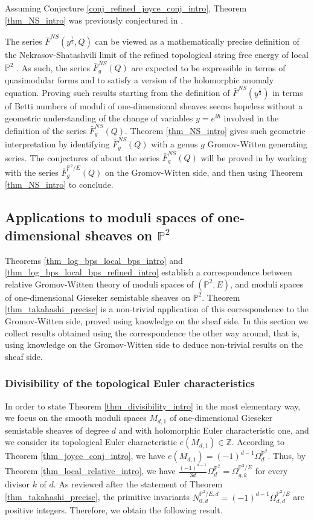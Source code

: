 \documentclass[11pt,letterpaper]{amsart}
\newcommand\PP{\mathbb P}
\newcommand\Z{\mathbb Z}
\begin{document}
Assuming Conjecture \ref{conj_refined_joyce_conj_intro}, 
Theorem \ref{thm_NS_intro} was previously conjectured in 
\cite[\S 8.6]{bousseau2018quantum_tropical}.

The series $\bar{F}^{NS}(y^{\frac{1}{2}},Q)$ can be viewed as a mathematically precise definition of the Nekrasov-Shatashvili limit of the refined 
topological string free energy of local $\PP^2$
\cite{MR3024275}. As such, the series $\bar{F}^{NS}_g(Q)$ are expected to be expressible in terms of quasimodular forms and to satisfy a version of the holomorphic anomaly equation. Proving such results starting from the definition of  $\bar{F}^{NS}(y^{\frac{1}{2}})$ in terms 
of Betti numbers of moduli of one-dimensional sheaves seems hopeless without a geometric understanding of the change of variables $y=e^{i\hbar}$ involved in the definition of the series $\bar{F}^{NS}_g(Q)$. Theorem 
\ref{thm_NS_intro} gives such geometric interpretation by identifying 
$\bar{F}^{NS}_g(Q)$ with a genus $g$ Gromov-Witten generating series.
The conjectures of \cite{MR3024275} about the series $\bar{F}_g^{NS}(Q)$ will be proved in \cite{HAE}
by working with the series $\bar{F}_g^{\PP^2/E}(Q)$ on the Gromov-Witten side, and then using Theorem \ref{thm_NS_intro} to conclude.

\subsection{Applications to moduli spaces of one-dimensional sheaves on $\PP^2$}

Theorems \ref{thm_log_bps_local_bps_intro} and 
\ref{thm_log_bps_local_bps_refined_intro} establish a  correspondence between relative Gromov-Witten theory of moduli spaces of $(\PP^2,E)$, and moduli spaces of one-dimensional Gieseker semistable sheaves on $\PP^2$.
Theorem \ref{thm_takahashi_precise} is a non-trivial application of this correspondence to the Gromov-Witten side, proved using knowledge on the sheaf side. 
In this section we collect results obtained using the correspondence the other way around, that is, using knowledge on the Gromov-Witten side to deduce non-trivial results on the sheaf side. 

\subsubsection{Divisibility of the topological Euler characteristics}
In order to state Theorem \ref{thm_divisibility_intro}
in the most elementary way, we focus on the smooth moduli spaces $M_{d,1}$ of one-dimensional Gieseker semistable sheaves 
of degree $d$ and with holomorphic Euler characteristic one, and we consider its topological Euler characteristic 
$e(M_{d,1}) \in \Z$. According to Theorem \ref{thm_joyce_conj_intro}, we have $e(M_{d,1})=(-1)^{d-1}
\Omega_d^{\PP^2}$. Thus, by Theorem \ref{thm_local_relative_intro}, we have 
$\frac{(-1)^{d-1}}{3d} \Omega_d^{\PP^2}= \Omega_{g,k}^{\PP^2/E}$ for every divisor 
$k$ of $d$. As reviewed after the statement of 
Theorem \ref{thm_takahashi_precise},
the primitive invariants $N_{0,d}^{\PP^2/E,d}=(-1)^{d-1}\Omega_{d,d}^{\PP^2/E}$
are positive integers. Therefore, we obtain the following result.
\end{document}
